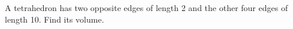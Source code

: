 A tetrahedron has two opposite edges of length 2 and the other four edges of length 10. Find its volume.
